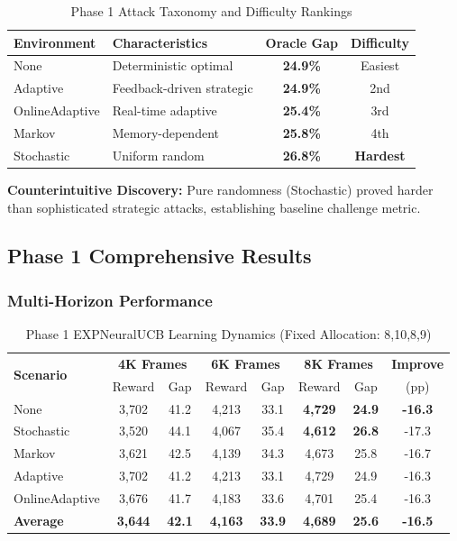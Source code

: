 \documentclass[11pt,a4paper]{article}
\newcommand{\performance}[1]{\textcolor{performancecolor}{\textbf{#1}}}
\newcommand{\stochastic}[1]{\textcolor{stochasticcolor}{\textbf{#1}}}
\newcommand{\critical}[1]{\textcolor{criticalcolor}{\textbf{#1}}}
\newcommand{\success}[1]{\textcolor{successcolor}{\textbf{#1}}}
\begin{document}
\begin{table}[h]
\small\centering
\caption{Phase 1 Attack Taxonomy and Difficulty Rankings}
\begin{tabular}{lp{5cm}cc}
\toprule
\textbf{Environment} & \textbf{Characteristics} & \textbf{Oracle Gap} & \textbf{Difficulty} \\
\midrule
None & Deterministic optimal & \performance{24.9\%} & Easiest \\
Adaptive & Feedback-driven strategic & \performance{24.9\%} & 2nd \\
OnlineAdaptive & Real-time adaptive & \performance{25.4\%} & 3rd \\
Markov & Memory-dependent & \stochastic{25.8\%} & 4th \\
Stochastic & Uniform random & \critical{26.8\%} & \critical{Hardest} \\
\bottomrule
\end{tabular}
\end{table}

\textbf{Counterintuitive Discovery:} Pure randomness (Stochastic) proved harder than sophisticated strategic attacks, establishing baseline challenge metric.

\subsection{Phase 1 Comprehensive Results}

\subsubsection{Multi-Horizon Performance}

\begin{table}[h]
\centering\small
\caption{Phase 1 EXPNeuralUCB Learning Dynamics (Fixed Allocation: 8,10,8,9)}
\begin{tabular}{lccccccc}
\toprule
\multirow{2}{*}{\textbf{Scenario}} & \multicolumn{2}{c}{\textbf{4K Frames}} & \multicolumn{2}{c}{\textbf{6K Frames}} & \multicolumn{2}{c}{\textbf{8K Frames}} & \textbf{Improve} \\
& Reward & Gap & Reward & Gap & Reward & Gap & (pp) \\
\midrule
None & 3,702 & 41.2 & 4,213 & 33.1 & \performance{4,729} & \performance{24.9} & \success{-16.3} \\
Stochastic & 3,520 & 44.1 & 4,067 & 35.4 & \stochastic{4,612} & \stochastic{26.8} & -17.3 \\
Markov & 3,621 & 42.5 & 4,139 & 34.3 & 4,673 & 25.8 & -16.7 \\
Adaptive & 3,702 & 41.2 & 4,213 & 33.1 & 4,729 & 24.9 & -16.3 \\
OnlineAdaptive & 3,676 & 41.7 & 4,183 & 33.6 & 4,701 & 25.4 & -16.3 \\
\midrule
\textbf{Average} & \textbf{3,644} & \textbf{42.1} & \textbf{4,163} & \textbf{33.9} & \performance{\textbf{4,689}} & \performance{\textbf{25.6}} & \success{\textbf{-16.5}} \\
\bottomrule
\end{tabular}
\end{table}
\end{document}
